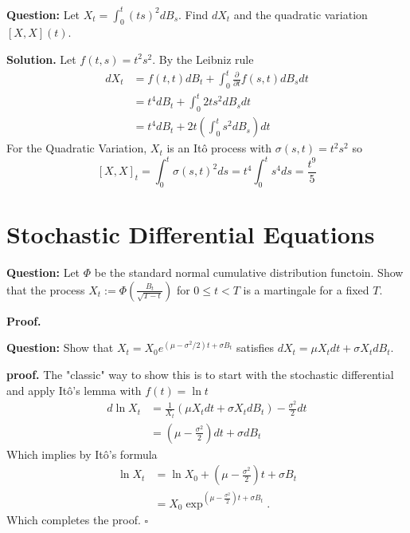 \documentclass{article}
\begin{document}
\begin{tcolorbox}[colframe=black,colback=gray!5,boxrule=0.5pt]
\textbf{Question:} Let $X_t = \int_0^t (ts)^2dB_s$. Find $dX_t$ and the quadratic variation $[X,X](t)$.
\end{tcolorbox}
\textbf{Solution.} Let $f(t,s) = t^2s^2$. By the Leibniz rule 
\begin{align*}
    dX_t &= f(t,t)dB_t + \int_0^t \frac{\partial}{\partial t}f(s,t) dB_sdt  \\
         &= t^4dB_t + \int_0^t 2ts^2dB_sdt \\
         &= t^4dB_t + 2t \left(\int_0^t s^2dB_s\right)dt
\end{align*}
For the Quadratic Variation, $X_t$ is an Itô process with $\sigma(s,t) = t^2 s^2$ so
$$[X,X]_t = \int_0^t \sigma(s,t)^2 ds = t^4\int_0^t s^4ds = \frac{t^9}{5}$$


\newpage
\section{Stochastic Differential Equations}

\begin{tcolorbox}[colframe=black,colback=gray!5,boxrule=0.5pt]
\textbf{Question:} Let $\Phi$ be the standard normal cumulative distribution functoin. Show that the process $X_t := \Phi(\frac{B_t}{\sqrt{T-t}})$ for $0\leq t<T$ is a martingale for a fixed $T$.
\end{tcolorbox}
\textbf{Proof.}




























\begin{tcolorbox}[colframe=black,colback=gray!5,boxrule=0.5pt]
\textbf{Question:} Show that $X_t = X_0 e^{(\mu-\sigma^2/2)t + \sigma B_t}$ satisfies $dX_t =\mu X_t dt + \sigma X_t dB_t$.
\end{tcolorbox}
\textbf{proof.} The "classic" way to show this is to start with the stochastic differential and apply Itô's lemma with $f(t) = \ln t$
\begin{align*}
    d\ln X_t  &= \frac{1}{X_t}(\mu X_t dt + \sigma X_t dB_t) - \frac{\sigma^2}{2}dt \\
              &= \left(\mu - \frac{\sigma^2}{2}\right)dt + \sigma dB_t
\end{align*}
Which implies by Itô's formula
\begin{align*}
    \ln X_t &= \ln X_0 + \left(\mu - \frac{\sigma^2}{2}\right)t + \sigma B_t \\
    &= X_0 \exp^{\left(\mu - \frac{\sigma^2}{2}\right)t + \sigma B_t}.
\end{align*}
Which completes the proof. $\square$
\end{document}
